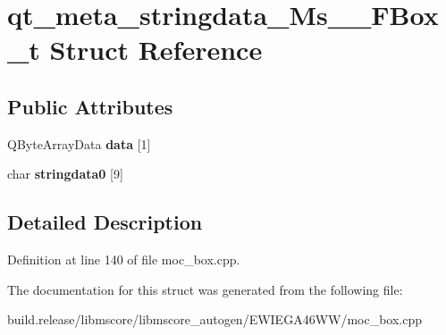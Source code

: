 \hypertarget{structqt__meta__stringdata___ms_____f_box__t}{}\section{qt\+\_\+meta\+\_\+stringdata\+\_\+\+Ms\+\_\+\+\_\+\+F\+Box\+\_\+t Struct Reference}
\label{structqt__meta__stringdata___ms_____f_box__t}
\subsection*{Public Attributes}
\begin{DoxyCompactItemize}
\item 
\mbox{\label{structqt__meta__stringdata___ms_____f_box__t_acbe00da8cf9d122851144a3fd8cb25e1}} 
Q\+Byte\+Array\+Data {\bfseries data} \mbox{[}1\mbox{]}
\item 
\mbox{\label{structqt__meta__stringdata___ms_____f_box__t_a3fb4643a1b5133b10d322309d1ea2eb2}} 
char {\bfseries stringdata0} \mbox{[}9\mbox{]}
\end{DoxyCompactItemize}


\subsection{Detailed Description}


Definition at line 140 of file moc\+\_\+box.\+cpp.



The documentation for this struct was generated from the following file\+:\begin{DoxyCompactItemize}
\item 
build.\+release/libmscore/libmscore\+\_\+autogen/\+E\+W\+I\+E\+G\+A46\+W\+W/moc\+\_\+box.\+cpp\end{DoxyCompactItemize}
